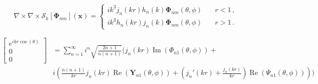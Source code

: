 \documentclass[11pt]{article}
\newcommand\bx{\boldsymbol x}
\newcommand\bY{\boldsymbol Y}
\newcommand\bPhi{\boldsymbol \Phi}
\newcommand\cS{\mathcal{S}}
\renewcommand\Re{\operatorname{Re}}
\renewcommand\Im{\operatorname{Im}}
\theoremstyle{definition}
\theoremstyle{remark}
\numberwithin{equation}{section}
\begin{document}
\begin{equation}
\nabla \times \nabla \times \cS_{k}[\bPhi_{nm}](\bx) = \begin{cases}
ik^3 j_{n}(kr) h_{n}(k) \bPhi_{nm}(\theta,\phi) &\quad r<1 \,, \\
ik^3 h_{n}(kr) j_{n}(k) \bPhi_{nm}(\theta,\phi) &\quad r>1 \,.
\end{cases}
\end{equation}

\begin{equation}
\begin{aligned}
\begin{bmatrix}
e^{ikr \cos{(\theta)}} \\
0 \\
0
\end{bmatrix}
&= 
\sum_{n=1}^{\infty} i^{n} \sqrt{\frac{2n+1}{n(n+1)}} \bigg(j_{n}(kr) \Im{\left(\Phi_{n1}(\theta, \phi)\right)} + \\
&i\left(\frac{n (n+1)}{kr} j_{n}(kr) \Re{\left(\bY_{n1}(\theta, \phi)\right)} + \left(j_{n}'(kr) + \frac{j_{n}(kr)}{kr} \right) \Re{(\Psi_{n1}(\theta, \phi))}   \right) \bigg)
\end{aligned}
\end{equation}
\end{document}
